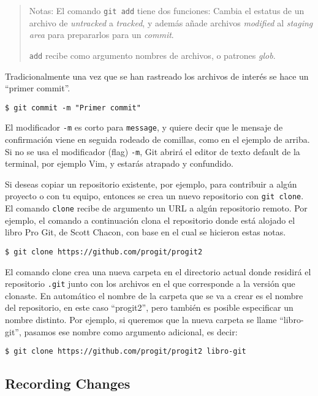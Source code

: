 \documentclass[spanish, 12pt, a4paper]{article}
\begin{document}
\begin{quote}
Notas: El comando \texttt{git add} tiene dos funciones: Cambia el
estatus de un archivo de \emph{untracked} a \emph{tracked}, y además
añade archivos \emph{modified} al \emph{staging area} para prepararlos
para un \emph{commit}.

\texttt{add} recibe como argumento nombres de archivos, o patrones
\emph{glob}.
\end{quote}

Tradicionalmente una vez que se han rastreado los archivos de interés se
hace un ``primer commit''.

\begin{lstlisting}
$ git commit -m "Primer commit"
\end{lstlisting}

El modificador \texttt{-m} es corto para \texttt{message}, y quiere
decir que le mensaje de confirmación viene en seguida rodeado de
comillas, como en el ejemplo de arriba. Si no se usa el modificador
(flag) \texttt{-m}, Git abrirá el editor de texto default de la
terminal, por ejemplo Vim, y estarás atrapado y confundido.

Si deseas copiar un repositorio existente, por ejemplo, para contribuir
a algún proyecto o con tu equipo, entonces se crea un nuevo repositorio
con \texttt{git\ clone}. El comando \texttt{clone} recibe de argumento
un URL a algún repositorio remoto. Por ejemplo, el comando a
continuación clona el repositorio donde está alojado el libro Pro Git,
de Scott Chacon, con base en el cual se hicieron estas notas.

\begin{lstlisting}
$ git clone https://github.com/progit/progit2
\end{lstlisting}

El comando clone crea una nueva carpeta en el directorio actual donde
residirá el repositorio \texttt{.git} junto con los archivos en el que
corresponde a la versión que clonaste. En automático el nombre de la
carpeta que se va a crear es el nombre del repositorio, en este caso
``progit2'', pero también es posible especificar un nombre distinto. Por
ejemplo, si queremos que la nueva carpeta se llame ``libro-git'',
pasamos ese nombre como argumento adicional, es decir:

\begin{lstlisting}
$ git clone https://github.com/progit/progit2 libro-git
\end{lstlisting}

\subsection{Recording Changes}
\end{document}
